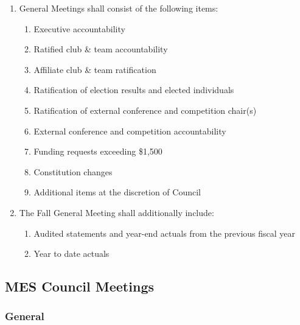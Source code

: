 \begin{enumerate}
 \item
  General Meetings shall consist of the following items:
  \begin{enumerate}
   \item
    Executive accountability
   \item
    Ratified club \& team accountability
   \item
    Affiliate club \& team ratification
   \item
    Ratification of election results and elected individuals
   \item
    Ratification of external conference and competition chair(s)
   \item
    External conference and competition accountability
   \item
    Funding requests exceeding \$1,500
   \item
    Constitution changes
   \item
    Additional items at the discretion of Council

  \end{enumerate}

 \item
  The Fall General Meeting shall additionally include:
  \begin{enumerate}
   \item
    Audited statements and year-end actuals from the previous fiscal year
   \item
    Year to date actuals

  \end{enumerate}
\end{enumerate}

\subsection{MES Council Meetings}
\label{mes-council-meetings}

\subsubsection{General}
\label{meetings-general}

